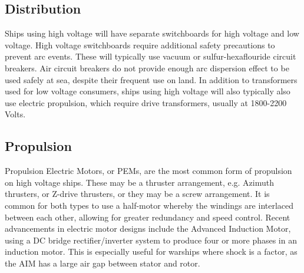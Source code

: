 \documentclass[11pt,a4paper]{article}
\begin{document}
\subsection*{Distribution}
Ships using high voltage will have separate switchboards for high voltage and low voltage. High voltage switchboards require additional safety precautions to prevent arc events. These will typically use vacuum or sulfur-hexaflouride circuit breakers. Air circuit breakers do not provide enough arc dispersion effect to be used safely at sea, despite their frequent use on land. In addition to transformers used for low voltage consumers, ships using high voltage will also typically also use electric propulsion, which require drive transformers, usually at 1800-2200 Volts.
\subsection*{Propulsion}
Propulsion Electric Motors, or PEMs, are the most common form of propulsion on high voltage ships. These may be a thruster arrangement, e.g. Azimuth thrusters, or Z-drive thrusters, or they may be a screw arrangement. It is common for both types to use a half-motor whereby the windings are interlaced between each other, allowing for greater redundancy and speed control. Recent advancements in electric motor designs include the Advanced Induction Motor, using a DC bridge rectifier/inverter system to produce four or more phases in an induction motor. This is especially useful for warships where shock is a factor, as the AIM has a large air gap between stator and rotor.
\end{document}
